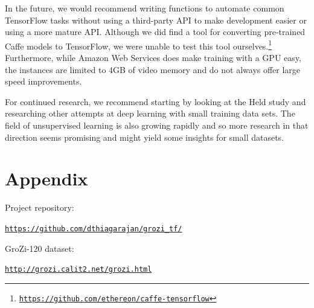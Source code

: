 \documentclass[letterpaper, 11pt]{article}
\begin{document}
In the future, we would recommend writing functions to automate common TensorFlow tasks without using a third-party API to make development easier or using a more mature API. Although we did find a tool for converting pre-trained Caffe models to TensorFlow, we were unable to test this tool ourselves.\footnote{\texttt{\href{https://github.com/ethereon/caffe-tensorflow}{https://github.com/ethereon/caffe-tensorflow}}} Furthermore, while Amazon Web Services does make training with a GPU easy, the instances are limited to 4GB of video memory and do not always offer large speed improvements.

For continued research, we recommend starting by looking at the Held study \cite{DBLP:journals/corr/HeldTS15} and researching other attempts at deep learning with small training data sets. The field of unsupervised learning is also growing rapidly and so more research in that direction seems promising and might yield some insights for small datasets.

\newpage
\nocite{DBLP:journals/corr/GeorgeMSFM15}



\newpage
\appendix
\section{Appendix}


Project repository:

\begin{center}
\texttt{\href{https://github.com/dthiagarajan/grozi_tf/}{https://github.com/dthiagarajan/grozi\_tf/}}
\end{center}

GroZi-120 dataset:
\begin{center}
\texttt{\href{http://grozi.calit2.net/grozi.html}{http://grozi.calit2.net/grozi.html}}
\end{center}
\end{document}
